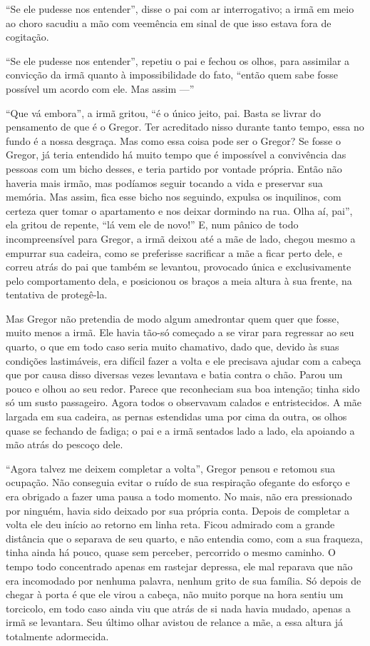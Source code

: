 “Se ele pudesse nos entender”, disse o pai com ar interrogativo; a irmã em
meio ao choro sacudiu a mão com veemência em sinal de que isso estava fora
de cogitação.

“Se ele pudesse nos entender”, repetiu o pai e fechou os olhos, para
assimilar a convicção da irmã quanto à impossibilidade do fato, “então
quem sabe fosse possível um acordo com ele. Mas assim ---”

“Que vá embora”, a irmã gritou, “é o único jeito, pai. Basta se livrar do
pensamento de que é o Gregor. Ter acreditado nisso durante tanto tempo,
essa no fundo é a nossa desgraça. Mas como essa coisa pode ser o Gregor?
Se fosse o Gregor, já teria entendido há muito tempo que é impossível a
convivência das pessoas com um bicho desses, e teria partido por vontade
própria. Então não haveria mais irmão, mas podíamos seguir tocando a vida
e preservar sua memória. Mas assim, fica esse bicho nos seguindo, expulsa
os inquilinos, com certeza quer tomar o apartamento e nos deixar dormindo
na rua. Olha aí, pai”, ela gritou de repente, “lá vem ele de novo!” E, num
pânico de todo incompreensível para Gregor, a irmã deixou até a mãe de
lado, chegou mesmo a empurrar sua cadeira, como se preferisse sacrificar a
mãe a ficar perto dele, e correu atrás do pai que também se levantou,
provocado única e exclusivamente pelo comportamento dela, e posicionou os
braços a meia altura à sua frente, na tentativa de protegê-la.

Mas Gregor não pretendia de modo algum amedrontar quem quer que fosse,
muito menos a irmã. Ele havia tão-só começado a se virar para regressar ao
seu quarto, o que em todo caso seria muito chamativo, dado que, devido às
suas condições lastimáveis, era difícil fazer a volta e ele precisava ajudar com a cabeça que por causa disso diversas vezes levantava e
batia contra o chão. Parou um pouco e olhou ao seu redor. Parece que
reconheciam sua boa intenção; tinha sido só um susto passageiro. Agora
todos o observavam calados e entristecidos. A mãe largada em sua cadeira,
as pernas estendidas uma por cima da outra, os olhos quase se fechando de
fadiga; o pai e a irmã sentados lado a lado, ela apoiando a mão atrás do
pescoço dele.

“Agora talvez me deixem completar a volta”, Gregor pensou e retomou sua
ocupação. Não conseguia evitar o ruído de sua respiração ofegante do
esforço e era obrigado a fazer uma pausa a todo momento. No mais, não era
pressionado por ninguém, havia sido deixado por sua própria conta. Depois
de completar a volta ele deu início ao retorno em linha reta. Ficou
admirado com a grande distância que o separava de seu quarto, e não
entendia como, com a sua fraqueza, tinha ainda há pouco, quase sem
perceber, percorrido o mesmo caminho. O tempo todo concentrado apenas em
rastejar depressa, ele mal reparava que não era incomodado por nenhuma
palavra, nenhum grito de sua família. Só depois de chegar à porta é que
ele virou a cabeça, não muito porque na hora sentiu um torcicolo, em todo
caso ainda viu que atrás de si nada havia mudado, apenas a irmã se
levantara. Seu último olhar avistou de relance a mãe, a essa altura já
totalmente adormecida.

